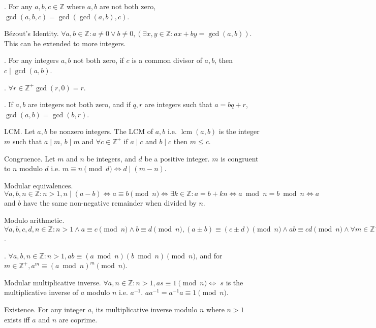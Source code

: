 \documentclass{slnotes}
\DeclareMathOperator{\lcm}{lcm}
\begin{document}
. For any \(a, b, c \in \mathbb{Z}\) where \(a, b\) are not both zero, \(\gcd(a, b, c) = \gcd(\gcd(a, b), c)\).

 Bézout's Identity. \(\forall a, b \in \mathbb{Z} : a \neq 0 \lor b \neq 0, (\exists x, y \in \mathbb{Z} : ax + by = \gcd(a, b))\). This can be extended to more integers.

. For any integers \(a, b\) not both zero, if \(c\) is a common divisor of \(a, b\), then \(c \mid \gcd(a, b)\).

. \(\forall r \in \mathbb{Z}^+ \gcd(r, 0) = r\).

. If \(a, b\) are integers not both zero, and if \(q, r\) are integers such that \(a = bq + r\), \(\gcd(a, b) = \gcd(b, r)\).

 LCM. Let \(a, b\) be nonzero integers. The LCM of \(a, b\) i.e. \(\lcm(a, b)\) is the integer \(m\) such that \(a \mid m\), \(b \mid m\) and \(\forall c \in \mathbb{Z}^+\) if \(a \mid c\) and \(b \mid c\) then \(m \le c\).

 Congruence. Let \(m\) and \(n\) be integers, and \(d\) be a positive integer. \(m\) is congruent to \(n\) modulo \(d\) i.e. \(m \equiv n \pmod d \Leftrightarrow d \mid (m - n)\).

 Modular equivalences. \(\forall a,b,n \in \mathbb{Z} : n > 1, n \mid (a - b) \Leftrightarrow a \equiv b \pmod n \Leftrightarrow \exists k \in \mathbb{Z} : a = b + kn \Leftrightarrow a \bmod n = b \bmod n \Leftrightarrow a\) and \(b\) have the same non-negative remainder when divided by \(n\).

 Modulo arithmetic. \(\forall a,b,c,d,n \in \mathbb{Z} : n > 1 \land a \equiv c \pmod n \land b \equiv d \pmod n, (a \pm b) \equiv (c \pm d) \pmod n \land ab \equiv cd \pmod n \land \forall m \in \mathbb{Z}^+, a^m \equiv c^m\).

. \(\forall a,b,n \in \mathbb{Z} : n > 1, ab \equiv (a\bmod n)(b\bmod n) \pmod n\), and for \(m \in \mathbb{Z}^+, a^m \equiv (a\bmod n)^m \pmod n\).

 Modular multiplicative inverse. \(\forall a, n \in \mathbb{Z} : n > 1, as \equiv 1 \pmod n \Leftrightarrow\) \(s\) is the multiplicative inverse of \(a\) modulo \(n\) i.e. \(a^{-1}\). \(aa^{-1} = a^{-1}a \equiv 1 \pmod n\).

 Existence. For any integer \(a\), its multiplicative inverse modulo \(n\) where \(n > 1\) exists iff \(a\) and \(n\) are coprime.
\end{document}
